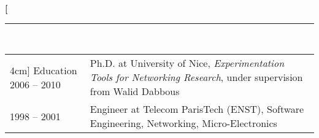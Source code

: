 \documentclass[a4paper,12pt]{article}
\newcommand{\ligne}[1]{\rule[0.5ex]{\textwidth}{#1}\\}
\newcommand{\styleRub}[1]{\textbf{\large #1}\par}
\newcommand{\indentStd}{\noindent\hspace*{10pt}}
\newenvironment{rubrique}[2][\linewidth]%
{\styleRub{#2}%
\ligne{0.5mm}
\setlength{\lenB}{#1}%
\setlength{\lenC}{\linewidth}%
\addtolength{\lenC}{-\lenA}%
\addtolength{\lenC}{-\lenB}%
\addtolength{\lenC}{-19pt}
\indentStd\begin{tabular}[t]{p{\lenB}p{\lenC}}}
{\end{tabular}}
\newlength{\lenA} %
\newlength{\lenB} %
\newlength{\lenC} %
\begin{document}
\vspace{0.5cm}
\begin{rubrique} [4cm] {Education}
  2006 -- 2010 & Ph.D. at University of Nice,
  \emph{Experimentation Tools for Networking Research}, under supervision from Walid Dabbous\\
  1998 -- 2001 & Engineer at Telecom ParisTech (ENST), Software Engineering, Networking, Micro-Electronics \\
\end{rubrique}
\end{document}
